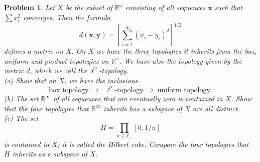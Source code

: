 \documentclass{article}
\newtheorem{problem}{Problem}
\begin{document}
\begin{problem}
Let $X$ be the subset of $\mathbb{R}^{\omega}$ consisting of all sequences $\mathbf{x}$ such that $\sum x_i^2$ converges. Then the formula
\[
d(\mathbf{x},\mathbf{y}) = \left [ \sum_{i=1}^{\infty} (x_i-y_i)^2 \right ]^{1/2}
\]
defines a metric on $X$. On $X$ we have the three topologies it inherits from the box, uniform and product topologies on $\mathbb{R}^{\omega}$. We have also the topology given by the metric $d$, which we call the \emph{$\ell^2$-topology}.\\
(a) Show that on $X$, we have the inclusions
\[
\text{box topology $\supseteq$ $\ell^2$-topology $\supseteq$ uniform topology.}
\]
(b) The set $\mathbb{R}^{\infty}$ of all sequences that are eventually zero is contained in $X$. Show that the four topologies that $\mathbb{R}^{\infty}$ inherits has a subspace of $X$ are all distinct.\\
(c) The set
\[
H = \prod_{n \in \mathbb{Z}_+} [0,1/n]
\]
is contained in $X$; it is called the \emph{Hilbert cube}. Compare the four topologies that $H$ inherits as a subspace of $X$.
\end{problem}
\end{document}
